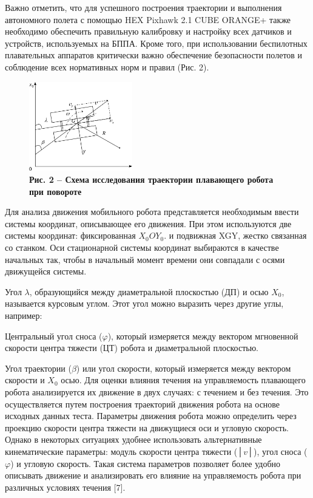 Важно отметить, что для успешного построения траектории и выполнения
автономного полета с помощью HEX Pixhawk 2.1 CUBE ORANGE+ также
необходимо обеспечить правильную калибровку и настройку всех датчиков и
устройств, используемых на БППА. Кроме того, при использовании
беспилотных плавательных аппаратов критически важно обеспечение
безопасности полетов и соблюдение всех нормативных норм и правил (Рис.
2).

\begin{figure}[H]
	\centering
	\includegraphics[width=0.4\textwidth]{assets/209}
	\caption*{\bfseries Рис. 2 -- Схема исследования траектории плавающего робота при
  повороте}
\end{figure}



Для анализа движения мобильного робота представляется необходимым ввести
системы координат, описывающее его движения. При этом используются две
системы координат: фиксированная \(X_{0}OY_{0}\). и подвижная XGY,
жестко связанная со станком. Оси стационарной системы координат
выбираются в качестве начальных так, чтобы в начальный момент времени
они совпадали с осями движущейся системы.

Угол \(\lambda\), образующийся между диаметральной плоскостью (ДП) и
осью \(X_{0}\), называется курсовым углом. Этот угол можно выразить
через другие углы, например:

Центральный угол сноса (\(\varphi\)), который измеряется между вектором
мгновенной скорости центра тяжести (ЦТ) робота и диаметральной
плоскостью.

Угол траектории (\(\beta\)) или угол скорости, который измеряется между
вектором скорости и \(X_{0}\) осью. Для оценки влияния течения на
управляемость плавающего робота анализируется их движение в двух
случаях: с течением и без течения. Это осуществляется путем построения
траекторий движения робота на основе исходных данных теста. Параметры
движения робота можно определить через проекцию скорости центра тяжести
на движущиеся оси и угловую скорость. Однако в некоторых ситуациях
удобнее использовать альтернативные кинематические параметры: модуль
скорости центра тяжести (│\(v\)│), угол сноса (\(\varphi\)) и угловую
скорость. Такая система параметров позволяет более удобно описывать
движение и анализировать его влияние на управляемость робота при
различных условиях течения {[}7{]}.

